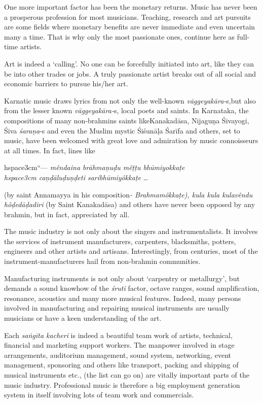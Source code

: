 One more important factor has been the monetary returns. Music has never been a prosperous profession for most musicians. Teaching, research and art pursuits are some fields where monetary benefits are never immediate and even uncertain many a time. That is why only the most passionate ones, continue here as full-time artists.

Art is indeed a ‘calling’. No one can be forcefully initiated into art, like they can be into other trades or jobs. A truly passionate artist breaks out of all social and economic barriers to pursue his/her art.

Karnatic music draws lyrics from not only the well-known \textit{vāggeyakāra-}s,\break but also from the lesser known \textit{vāggeyakāra-}s, local poets and saints. In Karnataka, the compositions of many non-brahmins saints like\break Kanakadāsa, Nijaguṇa Śivayogi, Śiva \textit{śaraṇa}-s and even the Muslim mystic Śiśunāḷa Śarīfa and others, set to music, have been welcomed with great love and admiration by music connoisseurs at all times. In fact, lines like

\begin{myquote}
hspace{3cm}“--- \textit{mêndaina brāhmaṇuḍu mêṭṭu bhūmiyokkaṭe \\hspace{3cm} caṇḍāluḍuṇḍeti saribhūmiyôkkaṭe} … 
\end{myquote}

(by saint Annamayya in his composition\textit{- Brahmamôkkaṭe), kula kula kulavêndu hôḍedāḍadiri} (by Saint Kanakadāsa) and others have never been opposed by any brahmin, but in fact, appreciated by all.

The music industry is not only about the singers and instrumentalists. It involves the services of instrument manufacturers, carpenters, blacksmiths, potters, engineers and other artists and artisans. Interestingly, from centuries, most of the instrument-manufacturers hail from non-brahmin communities.

Manufacturing instruments is not only about ‘carpentry or metallurgy’, but demands a sound knowhow of the \textit{śruti} factor, octave ranges, sound amplification, resonance, acoustics and many more musical features. Indeed, many persons involved in manufacturing and repairing musical instruments are usually musicians or have a keen understanding of the art.

Each \textit{saṅgīta kacheri} is indeed a beautiful team work of artists, technical, financial and marketing support workers. The manpower involved in stage arrangements, auditorium management, sound system, networking, event management, sponsoring and others like transport, packing and shipping of musical instruments etc., (the list can go on) are vitally important parts of the music industry. Professional music is therefore a big employment generation system in itself involving lots of team work and commercials.

